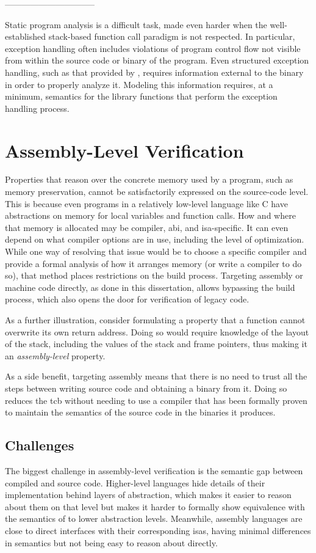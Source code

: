 --------------------------------

Static program analysis is a difficult task, made even harder when the well-established
stack-based function call paradigm is not respected. In particular,
exception handling often includes violations of program control flow not visible
from within the source code or binary of the program.
Even structured exception handling, such as that provided by \Cpp,
requires information external to the binary in order to properly analyze it.
Modeling this information requires, at a minimum,
semantics for the library functions that perform the exception handling process.

\section{Assembly-Level Verification}
Properties that reason over the concrete memory used by a program,
such as memory preservation, cannot be satisfactorily expressed on the source-code level.
This is because even programs in a relatively low-level language like C
have abstractions on memory for local variables and function calls.
How and where that memory is allocated may be compiler, \ac{abi}, and \ac{isa}-specific.
It can even depend on what compiler options are in use,
including the level of optimization.
While one way of resolving that issue would be to choose a specific compiler
and provide a formal analysis of how it arranges memory (or write a compiler to do so),
that method places restrictions on the build process.
Targeting assembly or machine code directly, as done in this dissertation,
allows bypassing the build process,
which also opens the door for verification of legacy code.
\begin{example}\label{ex:rop}
  As a further illustration, consider formulating a property
  that a function cannot overwrite its own return address.
  Doing so would require knowledge of the layout of the stack,
  including the values of the stack and frame pointers,
  thus making it an \emph{assembly-level} property.
\end{example}
As a side benefit,
targeting assembly means that there is no need to trust all the steps between
writing source code and obtaining a binary from it.
Doing so reduces the \ac{tcb} without needing to use a compiler
that has been formally proven to maintain
the semantics of the source code in the binaries it produces.

\subsection{Challenges}\label{asm_challenges}
The biggest challenge in assembly-level verification is
the semantic gap between compiled and source code.
Higher-level languages hide details of their implementation
behind layers of abstraction, which makes it easier to reason about them on that level
but makes it harder to formally show equivalence with the semantics of
to lower abstraction levels.
Meanwhile, assembly languages are close to direct interfaces
with their corresponding \acp{isa},
having minimal differences in semantics but not being easy to reason about directly.

